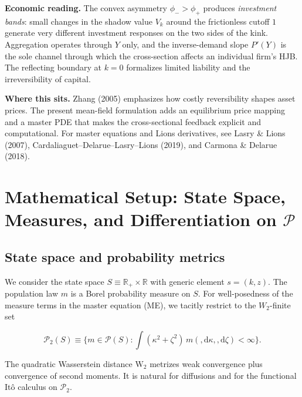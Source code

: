 \documentclass[11pt,letterpaper,oneside]{article}
\numberwithin{equation}{section}
\newcommand{\R}{\mathbb{R}}
\newcommand{\1}{\mathbf{1}}
\newcommand{\diff}{,\mathrm{d}}
\begin{document}
\begin{tcolorbox}[didacticstyle]
\textbf{Economic reading.} The convex asymmetry $\phi_->\phi_+$ produces \emph{investment bands}: small changes in the shadow value $V_k$ around the frictionless cutoff $1$ generate very different investment responses on the two sides of the kink. Aggregation operates through $Y$ only, and the inverse-demand slope $P'(Y)$ is the sole channel through which the cross-section affects an individual firm's HJB. The reflecting boundary at $k=0$ formalizes limited liability and the irreversibility of capital.
\end{tcolorbox}

\begin{tcolorbox}[literaturestyle]
\textbf{Where this sits.} Zhang (2005) emphasizes how costly reversibility shapes asset prices. The present mean-field formulation adds an equilibrium price mapping and a master PDE that makes the cross-sectional feedback explicit and computational. For master equations and Lions derivatives, see Lasry \& Lions (2007), Cardaliaguet--Delarue--Lasry--Lions (2019), and Carmona \& Delarue (2018).
\end{tcolorbox}

\section{Mathematical Setup: State Space, Measures, and Differentiation on \texorpdfstring{$\mathcal P$}{P}}

\subsection{State space and probability metrics}
We consider the state space $S\equiv \R_+\times\R$ with generic element $s=(k,z)$. The population law $m$ is a Borel probability measure on $S$. For well-posedness of the measure terms in the master equation (ME), we tacitly restrict to the $W_2$-finite set

$$
\mathcal P_2(S)\equiv\Big\{ m\in\mathcal P(S): \int (\kappa^2 + \zeta^2)\, m(\diff\kappa,\diff\zeta) < \infty\Big\}.
$$

The quadratic Wasserstein distance $\mathrm{W}_2$ metrizes weak convergence plus convergence of second moments. It is natural for diffusions and for the functional Itô calculus on $\mathcal P_2$.
\end{document}
